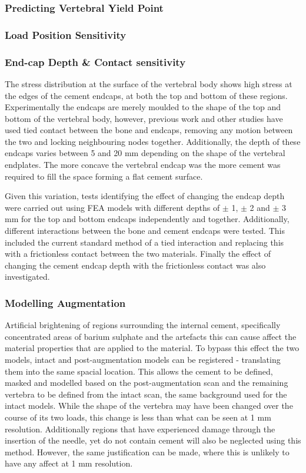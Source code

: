 \subsubsection{Predicting Vertebral Yield Point}\label{predYield}

\subsubsection{Load Position Sensitivity}

\subsubsection{End-cap Depth \& Contact sensitivity}

The stress distribution at the surface of the vertebral body shows high stress at the edges of the cement endcaps, at both the top and bottom of these regions.
Experimentally the endcaps are merely moulded to the shape of the top and bottom of the vertebral body, however, previous work and other studies have used tied contact between the bone and endcaps, removing any motion between the two and locking neighbouring nodes together.
Additionally, the depth of these endcaps varies between 5 and 20 mm depending on the shape of the vertebral endplates.
The more concave the vertebral endcap was the more cement was required to fill the space forming a flat cement surface.

Given this variation, tests identifying the effect of changing the endcap depth were carried out using FEA models with different depths of $\pm$ 1, $\pm$ 2 and $\pm$ 3 mm for the top and bottom endcaps independently and together.
Additionally, different interactions between the bone and cement endcaps were tested.
This included the current standard method of a tied interaction and replacing this with a frictionless contact between the two materials.
Finally the effect of changing the cement endcap depth with the frictionless contact was also investigated.


\subsubsection{Modelling Augmentation}

Artificial brightening of regions surrounding the internal cement, specifically concentrated areas of barium sulphate and the
artefacts this can cause affect the material properties that are applied to the material.
To bypass this effect the two models, intact and post-augmentation models can be registered - translating them into the same spacial location.
This allows the cement to be defined, masked and modelled based on the post-augmentation scan and the remaining vertebra to be defined from the intact scan, the same background used for the intact models.
While the shape of the vertebra may have been changed over the course of its two loads, this change is less than what can be seen at 1 mm resolution.
Additionally regions that have experienced damage through the insertion of the needle, yet do not contain cement will also be neglected using this method.
However, the same justification can be made, where this is unlikely to have any affect at 1 mm resolution.


